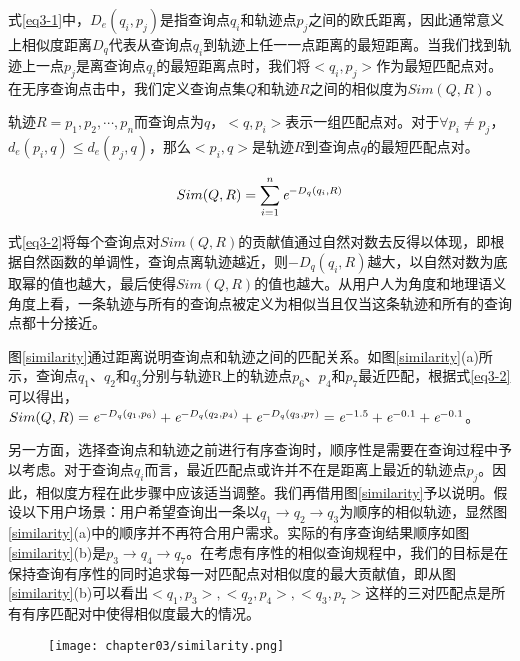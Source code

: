 式\ref{eq3-1}中，$D_{e}(q_{i}, p_{j})$是指查询点$q_{i}$和轨迹点$p_{j}$之间的欧氏距离，因此通常意义上相似度距离$D_{q}$代表从查询点$q_{i}$到轨迹上任一一点距离的最短距离。当我们找到轨迹上一点$p_{j}$是离查询点$q_{i}$的最短距离点时，我们将$<q_{i},p_{j}>$作为最短匹配点对。在无序查询点击中，我们定义查询点集$Q$和轨迹$R$之间的相似度为$Sim(Q,R)$。

\theoremstyle{definition}
\begin{definition}
	轨迹$R={p_{1}, p_{2}, \cdots, p_{n}}$而查询点为$q$，$<q, p_{i}>$表示一组匹配点对。对于$\forall p_{i} \neq p_{j}$， $d_{e}(p_{i}, q)\leq d_{e}(p_{j}, q)$，那么$<p_{i}, q>$是轨迹$R$到查询点$q$的最短匹配点对。
\end{definition}

\begin{equation}
	\label{eq3-2}
	Sim(Q,R) = \sum_{i=1}^{n} \emph{e}^{-D_{q}(q_{i}, R)}
\end{equation}

式\ref{eq3-2}将每个查询点对$Sim(Q,R)$的贡献值通过自然对数去反得以体现，即根据自然函数的单调性，查询点离轨迹越近，则$-D_{q}(q_{i}, R)$越大，以自然对数为底取幂的值也越大，最后使得$Sim(Q,R)$的值也越大。从用户人为角度和地理语义角度上看，一条轨迹与所有的查询点被定义为相似当且仅当这条轨迹和所有的查询点都十分接近。

图\ref{similarity}通过距离说明查询点和轨迹之间的匹配关系。如图\ref{similarity}(a)所示，查询点$q_{1}$、$q_{2}$和$q_{3}$分别与轨迹R上的轨迹点$p_{6}$、$p_{4}$和$p_{7}$最近匹配，根据式\ref{eq3-2}可以得出，$Sim(Q,R) = \emph{e}^{-D_{q}(q_{1}, p_{6})} + \emph{e}^{-D_{q}(q_{2}, p_{4})} + \emph{e}^{-D_{q}(q_{3}, p_{7})} = \emph{e}^{-1.5}+ \emph{e}^{-0.1} + \emph{e}^{-0.1}$。

另一方面，选择查询点和轨迹之前进行有序查询时，顺序性是需要在查询过程中予以考虑。对于查询点$q_{i}$而言，最近匹配点或许并不在是距离上最近的轨迹点$p_{j}$。因此，相似度方程在此步骤中应该适当调整。我们再借用图\ref{similarity}\cite{chen2010searching}予以说明。假设以下用户场景：用户希望查询出一条以$q_{1} \rightarrow q_{2} \rightarrow q_{3}$为顺序的相似轨迹，显然图\ref{similarity}(a)中的顺序并不再符合用户需求。实际的有序查询结果顺序如图\ref{similarity}(b)是$p_{3} \rightarrow q_{4} \rightarrow q_{7}$。在考虑有序性的相似查询规程中，我们的目标是在保持查询有序性的同时追求每一对匹配点对相似度的最大贡献值，即从图\ref{similarity}(b)可以看出$<q_{1},p_{3}>, <q_{2},p_{4}>, <q_{3},p_{7}>$这样的三对匹配点是所有有序匹配对中使得相似度最大的情况。

\begin{figure}[!htp]
  \centering
  \texttt{[image: chapter03/similarity.png]}
\end{figure}

